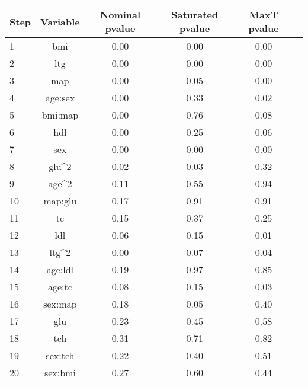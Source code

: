 \begin{tabular}{|l|c|c|c|c|c|}
\hline
 Step & Variable &  Nominal pvalue &  Saturated pvalue &  MaxT pvalue \\
\hline
    1 &      bmi &            0.00 &              0.00 &         0.00 \\
    2 &      ltg &            0.00 &              0.00 &         0.00 \\
    3 &      map &            0.00 &              0.05 &         0.00 \\
    4 &  age:sex &            0.00 &              0.33 &         0.02 \\
    5 &  bmi:map &            0.00 &              0.76 &         0.08 \\
    6 &      hdl &            0.00 &              0.25 &         0.06 \\
    7 &      sex &            0.00 &              0.00 &         0.00 \\
    8 &    glu^2 &            0.02 &              0.03 &         0.32 \\
    9 &    age^2 &            0.11 &              0.55 &         0.94 \\
   10 &  map:glu &            0.17 &              0.91 &         0.91 \\
   11 &       tc &            0.15 &              0.37 &         0.25 \\
   12 &      ldl &            0.06 &              0.15 &         0.01 \\
   13 &    ltg^2 &            0.00 &              0.07 &         0.04 \\
   14 &  age:ldl &            0.19 &              0.97 &         0.85 \\
   15 &   age:tc &            0.08 &              0.15 &         0.03 \\
   16 &  sex:map &            0.18 &              0.05 &         0.40 \\
   17 &      glu &            0.23 &              0.45 &         0.58 \\
   18 &      tch &            0.31 &              0.71 &         0.82 \\
   19 &  sex:tch &            0.22 &              0.40 &         0.51 \\
   20 &  sex:bmi &            0.27 &              0.60 &         0.44 \\
\hline
\end{tabular}

